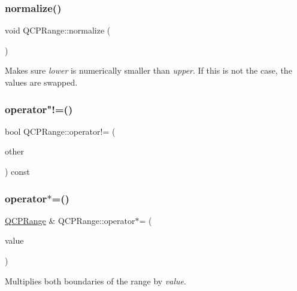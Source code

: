 \subsubsection{\texorpdfstring{normalize()}{normalize()}}
{\footnotesize\ttfamily void Q\+C\+P\+Range\+::normalize (\begin{DoxyParamCaption}{ }\end{DoxyParamCaption})\hspace{0.3cm}{\ttfamily [inline]}}

Makes sure {\itshape lower} is numerically smaller than {\itshape upper}. If this is not the case, the values are swapped. \mbox{\label{class_q_c_p_range_a4827a37c83b8bb4bf53fcf8f6a257e77}} 
\subsubsection{\texorpdfstring{operator"!=()}{operator!=()}}
{\footnotesize\ttfamily bool Q\+C\+P\+Range\+::operator!= (\begin{DoxyParamCaption}\item[{const \hyperlink{class_q_c_p_range}{Q\+C\+P\+Range} \&}]{other }\end{DoxyParamCaption}) const\hspace{0.3cm}{\ttfamily [inline]}}

\mbox{\label{class_q_c_p_range_a6876aa9620ff2f0f7f1873f998372cef}} 
\subsubsection{\texorpdfstring{operator$\ast$=()}{operator*=()}}
{\footnotesize\ttfamily \hyperlink{class_q_c_p_range}{Q\+C\+P\+Range} \& Q\+C\+P\+Range\+::operator$\ast$= (\begin{DoxyParamCaption}\item[{const double \&}]{value }\end{DoxyParamCaption})\hspace{0.3cm}{\ttfamily [inline]}}

Multiplies both boundaries of the range by {\itshape value}. \mbox{\label{class_q_c_p_range_afea7c1aa7d08f061cd9bd8832f957df8}} 
